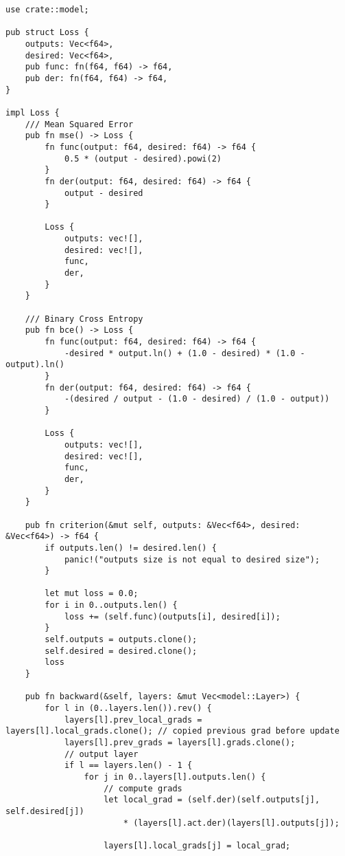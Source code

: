 \begin{verbatim}    
use crate::model;

pub struct Loss {
    outputs: Vec<f64>,
    desired: Vec<f64>,
    pub func: fn(f64, f64) -> f64,
    pub der: fn(f64, f64) -> f64,
}

impl Loss {
    /// Mean Squared Error
    pub fn mse() -> Loss {
        fn func(output: f64, desired: f64) -> f64 {
            0.5 * (output - desired).powi(2)
        }
        fn der(output: f64, desired: f64) -> f64 {
            output - desired
        }

        Loss {
            outputs: vec![],
            desired: vec![],
            func,
            der,
        }
    }

    /// Binary Cross Entropy
    pub fn bce() -> Loss {
        fn func(output: f64, desired: f64) -> f64 {
            -desired * output.ln() + (1.0 - desired) * (1.0 - output).ln()
        }
        fn der(output: f64, desired: f64) -> f64 {
            -(desired / output - (1.0 - desired) / (1.0 - output))
        }

        Loss {
            outputs: vec![],
            desired: vec![],
            func,
            der,
        }
    }

    pub fn criterion(&mut self, outputs: &Vec<f64>, desired: &Vec<f64>) -> f64 {
        if outputs.len() != desired.len() {
            panic!("outputs size is not equal to desired size");
        }

        let mut loss = 0.0;
        for i in 0..outputs.len() {
            loss += (self.func)(outputs[i], desired[i]);
        }
        self.outputs = outputs.clone();
        self.desired = desired.clone();
        loss
    }

    pub fn backward(&self, layers: &mut Vec<model::Layer>) {
        for l in (0..layers.len()).rev() {
            layers[l].prev_local_grads = layers[l].local_grads.clone(); // copied previous grad before update
            layers[l].prev_grads = layers[l].grads.clone();
            // output layer
            if l == layers.len() - 1 {
                for j in 0..layers[l].outputs.len() {
                    // compute grads
                    let local_grad = (self.der)(self.outputs[j], self.desired[j])
                        * (layers[l].act.der)(layers[l].outputs[j]);

                    layers[l].local_grads[j] = local_grad;


\end{verbatim}
